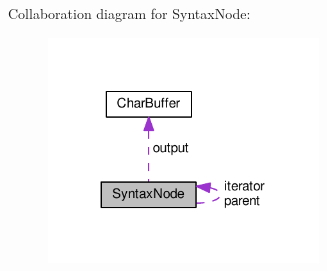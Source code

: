 Collaboration diagram for Syntax\+Node\+:\nopagebreak
\begin{figure}[H]
\begin{center}
\leavevmode
\includegraphics[width=203pt]{classSyntaxNode__coll__graph}
\end{center}
\end{figure}
